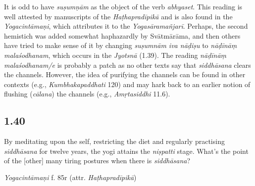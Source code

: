 \begin{ekdosis}
\begin{testimonia}[hp01_039]
\end{testimonia}

\begin{philcomm}[hp01_039]
It is odd to have \emph{suṣumṇām} as the object of the verb \emph{abhyaset}. This reading is well attested by manuscripts of the \emph{Haṭhapradīpikā} and is also found in the \emph{Yogacintāmaṇi}, which attributes it to the \emph{Yogasāramañjarī}. Perhaps, the second hemistich was added somewhat haphazardly by Svātmārāma, and then others have tried to make sense of it by changing \emph{suṣumnām iva nāḍiṣu} to \emph{nāḍīnāṃ malaśodhanam}, which occurs in the \emph{Jyotsnā} (1.39). The reading \emph{nāḍīnāṃ malaśodhanam/e} is probably a patch as no other texts say that \emph{siddhāsana} clears the channels. However, the idea of purifying the channels can be found in other contexts (e.g., \emph{Kumbhakapaddhati} 120) and may hark back to an earlier notion of flushing (\emph{cālana}) the channels (e.g., \emph{Amṛtasiddhi} 11.6).%

\end{philcomm}

\subsection*{1.40}
\begin{translation}[hp01_040]
By meditating upon the self, restricting the diet and regularly practising \emph{siddhāsana} for twelve years, the yogi attains the \emph{niṣpatti} stage.
What’s the point of the [other] many tiring postures when there is \emph{siddhāsana}?
\end{translation}


\begin{testimonia}[hp01_040]
\emph{Yogacintāmaṇi} f. 85r (attr. \emph{Haṭhapradīpikā})

\begin{versinnote}
\end{versinnote}


\end{testimonia}
\end{ekdosis}
